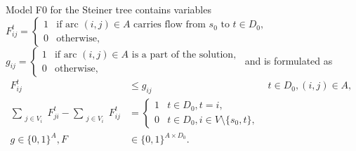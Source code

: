 Model F0 for the Steiner tree contains variables
%
\newline\newline
  $F^{t}_{ij}=
\begin{cases}
    1 & \text{if arc $(i,j) \in A$ carries flow from $s_0$ to $t\in D_0$},\\
    0 & \text{otherwise},
\end{cases}$
\newline\newline
  $g_{ij}=
\begin{cases}
    1 & \text{if arc $(i,j) \in A$ is a part of the solution},\\
    0 & \text{otherwise},
\end{cases}$
\newline\newline
%
and is formulated as
\begin{subequations}
\begin{align}
\label{con:pf1:xfrel} F^{t}_{ij} & \leq g_{ij} & t\in D_0, (i,j)\in A, \\
\label{con:pf1:flow} \sum\limits_{\substack{ j \in V_i }}F^{t}_{ji}-\sum\limits_{\substack{j\in V_i}}F^{t}_{ij} &= 
  \begin{cases}
    1 & t\in D_0, t = i,\\
    0 & t\in D_0, i\in V\setminus \{s_0, t\},
  \end{cases}\\
\label{con:pf1:dim}g \in \{0,1\}^{A},F&\in\{0,1\}^{A \times D_0}.
\end{align}~
\end{subequations}

